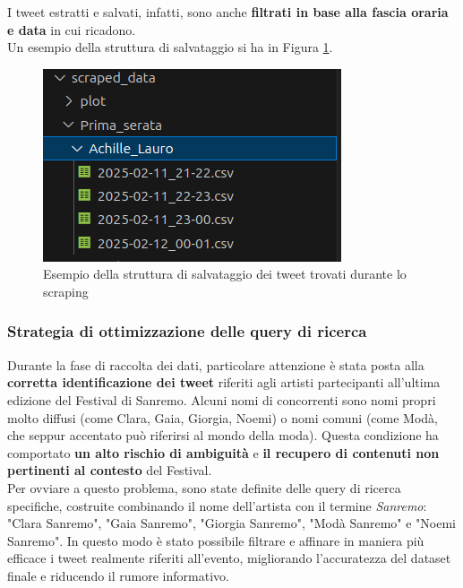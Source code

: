 \documentclass[a4paper,12pt]{article}
\begin{document}
I tweet estratti e salvati, infatti, sono anche \textbf{filtrati in base alla fascia oraria e data} in cui ricadono.\\
Un esempio della struttura di salvataggio si ha in Figura \ref{fig:esempio_struttura_cartelle_scraping}.
\begin{figure}[htbp]
    \centering
    \includegraphics[width=0.5\linewidth]{media/esempio_struttura_cartelle_scraping.png}
    \caption{Esempio della struttura di salvataggio dei tweet trovati durante lo scraping}
    \label{fig:esempio_struttura_cartelle_scraping}
\end{figure}

\subsubsection{Strategia di ottimizzazione delle query di ricerca}
Durante la fase di raccolta dei dati, particolare attenzione è stata posta alla \textbf{corretta identificazione dei tweet} riferiti agli artisti partecipanti all’ultima edizione del Festival di Sanremo. Alcuni nomi di concorrenti sono nomi propri molto diffusi (come Clara, Gaia, Giorgia, Noemi) o nomi comuni (come Modà, che seppur accentato può riferirsi al mondo della moda). Questa condizione ha comportato \textbf{un alto rischio di ambiguità} e \textbf{il recupero di contenuti non pertinenti al contesto} del Festival.\\Per ovviare a questo problema, sono state definite delle query di ricerca specifiche, costruite combinando il nome dell'artista con il termine \textit{Sanremo}: "Clara Sanremo", "Gaia Sanremo", "Giorgia Sanremo", "Modà Sanremo" e "Noemi Sanremo". In questo modo è stato possibile filtrare e affinare in maniera più efficace i tweet realmente riferiti all'evento, migliorando l'accuratezza del dataset finale e riducendo il rumore informativo.
\end{document}
